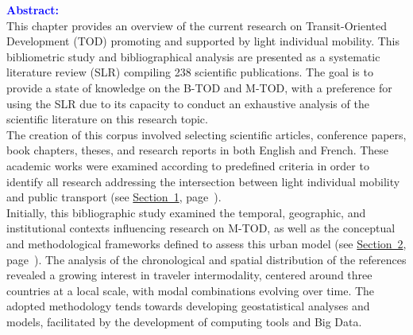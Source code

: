 \begin{refsegment}
    \newpage
    \begin{tcolorbox}[colback=white!5!white,
                      colframe=blue!75!blue,
                      title=
                      \bigskip
                      \center{\textbf{Preambule of Chapter~2}}
                      \\
                      \raggedright{\small{Chapter composed of \pagedifference{chap2:titre}{chap3:titre} pages, including \pagedifference{chap2:bibliographie}{chap3:titre} pages of bibliography}}
                      \bigskip]
\Large{\textbf{\textcolor{blue}{Abstract:}}}
    \\
    \small{
This chapter provides an overview of the current research on Transit-Oriented Development (TOD) promoting and supported by light individual mobility. This bibliometric study and bibliographical analysis are presented as a systematic literature review (SLR) compiling 238 scientific publications. The goal is to provide a state of knowledge on the B-TOD and M-TOD, with a preference for using the SLR due to its capacity to conduct an exhaustive analysis of the scientific literature on this research topic.%
    \\
The creation of this corpus involved selecting scientific articles, conference papers, book chapters, theses, and research reports in both English and French. These academic works were examined according to predefined criteria in order to identify all research addressing the intersection between light individual mobility and public transport (see \hyperref[chap2:protocole-methodologique-rsl]{Section~1}, page~\pageref{chap2:protocole-methodologique-rsl}).%
    \\
Initially, this bibliographic study examined the temporal, geographic, and institutional contexts influencing research on M-TOD, as well as the conceptual and methodological frameworks defined to assess this urban model (see \hyperref[chap2:analyse-documentation-rsl]{Section~2}, page~\pageref{chap2:analyse-documentation-rsl}). The analysis of the chronological and spatial distribution of the references revealed a growing interest in traveler intermodality, centered around three countries at a local scale, with modal combinations evolving over time. The adopted methodology tends towards developing geostatistical analyses and models, facilitated by the development of computing tools and Big Data.%
    \\
}
\end{tcolorbox}
\end{refsegment}
